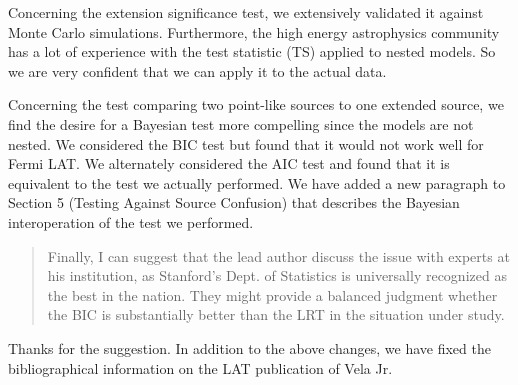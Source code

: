 \documentclass{article}
\newenvironment{referee}
{\begin{quote}\color{red}}
  {\end{quote}}
\newenvironment{reply}
  {}
  {}
\begin{document}
\begin{reply}
Concerning the extension significance test, we extensively validated it
against Monte Carlo simulations. Furthermore, the high energy astrophysics
community has a lot of experience with the test statistic (TS) applied to
nested models. So we are very confident that we can apply it to the actual
data.

Concerning the test comparing two point-like sources to one extended
source, we find the desire for a Bayesian test more compelling since the
models are not nested. We considered the BIC test but found that it would
not work well for Fermi LAT. We alternately considered the AIC test and
found that it is equivalent to the test we actually performed. We have
added a new paragraph to Section 5 (Testing Against Source Confusion)
that describes the Bayesian interoperation of the test we performed.
\end{reply}


\begin{referee}
Finally, I can suggest that the lead author discuss the issue with experts
at his institution, as Stanford's Dept. of Statistics is universally
recognized as the best in the nation. They might provide a balanced
judgment whether the BIC is substantially better than the LRT in the
situation under study.
\end{referee}


\begin{reply}
Thanks for the suggestion.  In addition to the above changes, we have
fixed the bibliographical information on the LAT publication of Vela Jr.
\end{reply}
\end{document}
